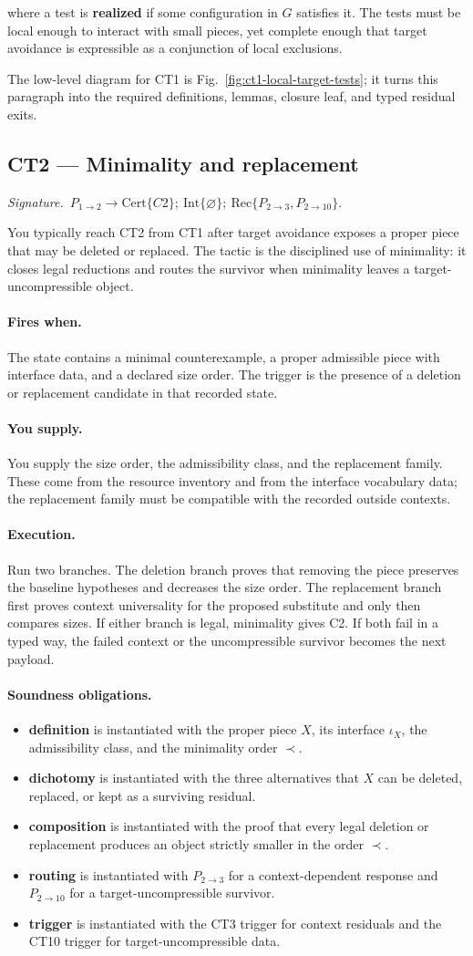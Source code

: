 \documentclass[
  11pt,
]{article}
\providecommand{\tightlist}{%
  \setlength{\itemsep}{0pt}\setlength{\parskip}{0pt}}
\theoremstyle{definition}
\newcommand{\ctsignature}[1]{\par\noindent\emph{Signature.}\ #1\par\medskip}
\newcommand{\ctcert}[1]{\mathrm{Cert}\{#1\}}
\newcommand{\ctint}[1]{\mathrm{Int}\{#1\}}
\newcommand{\ctrec}[1]{\mathrm{Rec}\{#1\}}
\newcommand{\ctnone}{\varnothing}
\newcommand{\ctpar}[1]{\paragraph{#1.}}
\begin{document}
where a test is \textbf{realized} if some configuration in \(G\)
satisfies it. The tests must be local enough to interact with small
pieces, yet complete enough that target avoidance is expressible as a
conjunction of local exclusions.

The low-level diagram for CT1 is Fig.~\ref{fig:ct1-local-target-tests};
it turns this paragraph into the required definitions, lemmas, closure
leaf, and typed residual exits.



\subsection{CT2 --- Minimality and replacement}\label{ct:2}\label{minimal-counterexample}
\ctsignature{\(P_{1\to2}\to \ctcert{C2};\ \ctint{\ctnone};\ \ctrec{P_{2\to3},P_{2\to10}}\).}

You typically reach CT2 from CT1 after target avoidance exposes a proper
piece that may be deleted or replaced.  The tactic is the disciplined use
of minimality: it closes legal reductions and routes the survivor when
minimality leaves a target-uncompressible object.

\ctpar{Fires when}
The state contains a minimal counterexample, a proper admissible piece
with interface data, and a declared size order.  The trigger is the
presence of a deletion or replacement candidate in that recorded state.

\ctpar{You supply}
You supply the size order, the admissibility class, and the replacement
family.  These come from the resource inventory and from the interface
vocabulary data; the replacement family must be compatible with the
recorded outside contexts.

\ctpar{Execution}
Run two branches.  The deletion branch proves that removing the piece
preserves the baseline hypotheses and decreases the size order.  The
replacement branch first proves context universality for the proposed
substitute and only then compares sizes.  If either branch is legal,
minimality gives C2.  If both fail in a typed way, the failed context or
the uncompressible survivor becomes the next payload.

\ctpar{Soundness obligations}
\begin{itemize}
\tightlist
\item \textbf{definition} is instantiated with the proper piece \(X\), its interface \(\iota_X\), the admissibility class, and the minimality order \(\prec\).
\item \textbf{dichotomy} is instantiated with the three alternatives that \(X\) can be deleted, replaced, or kept as a surviving residual.
\item \textbf{composition} is instantiated with the proof that every legal deletion or replacement produces an object strictly smaller in the order \(\prec\).
\item \textbf{routing} is instantiated with \(P_{2\to3}\) for a context-dependent response and \(P_{2\to10}\) for a target-uncompressible survivor.
\item \textbf{trigger} is instantiated with the CT3 trigger for context residuals and the CT10 trigger for target-uncompressible data.
\end{itemize}
\end{document}
